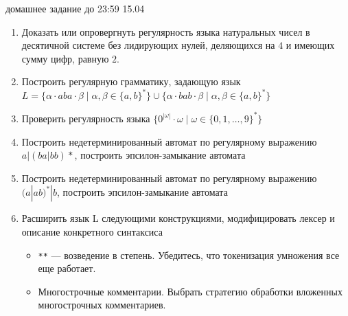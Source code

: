 \documentclass[12pt]{article}
\begin{document}

{\Large домашнее задание до 23:59 15.04}
\bigskip

\begin{enumerate}
  \item Доказать или опровергнуть регулярность языка натуральных чисел в десятичной системе без лидирующих нулей, деляющихся на $4$ и имеющих сумму цифр, равную $2$.
  \item Построить регулярную грамматику, задающую язык \\ $ L = \{ \alpha \cdot a b a \cdot \beta \mid \alpha, \beta \in \{ a, b \}^* \} \cup \{ \alpha \cdot b a b \cdot \beta \mid \alpha, \beta \in \{ a, b \}^* \} $
  \item Проверить регулярность языка $\{ 0^{|\omega|} \cdot \omega \mid \omega \in \{ 0, 1, \dots, 9 \}^* \} $
  \item {Построить недетерминированный автомат по регулярному выражению $ a|(ba|bb)* $, построить эпсилон-замыкание автомата }
  \item {Построить недетерминированный автомат по регулярному выражению $ (a|ab)^* | b $, построить эпсилон-замыкание автомата }
  \item Расширить язык L следующими конструкциями, модифицировать лексер и описание конкретного синтаксиса 
  \begin{itemize}
      \item \verb!**! --- возведение в степень. Убедитесь, что токенизация умножения все еще работает.
      \item Многострочные комментарии. Выбрать стратегию обработки вложенных многострочных комментариев.
  \end{itemize}
\end{enumerate}
\end{document}
